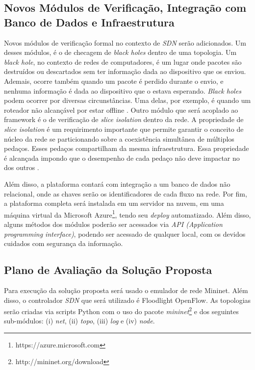 \documentclass[12pt]{article}
\begin{document}
\subsection{Novos Módulos de Verificação, Integração com Banco de Dados e Infraestrutura}
Novos módulos de verificação formal no contexto de \textit{SDN} serão adicionados.
Um desses módulos, é o de checagem de \textit{black holes} dentro de uma topologia.
Um \textit{black hole}, no contexto de redes de computadores, é um lugar onde pacotes são destruídos ou descartados sem ter informação dada ao dispositivo que os enviou.
Ademais, ocorre também quando um pacote é perdido durante o envio, e nenhuma informação é dada ao dispositivo que o estava esperando.
\textit{Black holes} podem ocorrer por diversas circunstâncias.
Uma delas, por exemplo, é quando um roteador não alcançável por estar offline \cite{7396103}.
Outro módulo que será acoplado ao framework é o de verificação de \textit{slice isolation} dentro da rede. A propriedade de \textit{slice isolation} é um requirimento importante que permite garantir o conceito de núcleo da rede se particionando sobre a coexistência simultânea de múltiplos pedaços. Esses pedaços compartilham da mesma infraestrutura.
Essa propriedade é alcançada impondo que o desempenho de cada pedaço não deve impactar no dos outros \cite{8104638}.

Além disso, a plataforma contará com integração a um banco de dados não relacional, onde as chaves serão os identificadores de cada fluxo na rede.
Por fim, a plataforma completa será instalada em um servidor na nuvem, em uma máquina virtual da Microsoft Azure\footnote{https://azure.microsoft.com}, tendo seu \textit{deploy} automatizado.
Além disso, alguns métodos dos módulos poderão ser acessados via \textit{API (Application programming interface)}, podendo ser acessado de qualquer local, com os devidos cuidados com segurança da informação.

\subsection{Plano de Avaliação da Solução Proposta}
Para execução da solução proposta será usado o emulador de rede Mininet.
Além disso, o controlador \textit{SDN} que será utilizado é Floodlight OpenFlow.
As topologias serão criadas via scripts Python com o uso do pacote \textit{mininet}\footnote{http://mininet.org/download} e dos seguintes sub-módulos: (i) \textit{net}, (ii) \textit{topo}, (iii) \textit{log} e (iv) \textit{node}.
\end{document}
